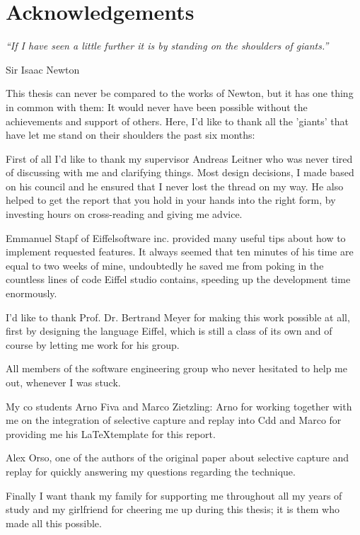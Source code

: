 \chapter*{Acknowledgements}
\begin{center}
 \textit{``If I have seen a little further it is by standing on the shoulders of giants.''}
\end{center}
\begin{flushright}
 Sir Isaac Newton
\end{flushright}

This thesis can never be compared to the works of Newton, but it has one thing in common with them: It would never have been possible without the achievements and support of others. Here, I'd like to thank all the 'giants' that have let me stand on their shoulders the past six months:

First of all I'd like to thank my supervisor Andreas Leitner who was never tired of discussing with me and clarifying things. Most design decisions, I made based on his council and he ensured that I never lost the thread on my way. He also helped to get the report that you hold in your hands into the right form, by investing hours on cross-reading and giving me advice.

Emmanuel Stapf of Eiffelsoftware inc. provided many useful tips about how to implement requested features. It always seemed that ten minutes of his time are equal to two weeks of mine, undoubtedly he saved me from poking in the countless lines of code Eiffel studio contains, speeding up the development time enormously.

I'd like to thank Prof. Dr. Bertrand Meyer for making this work possible at all, first by designing the language Eiffel, which is still a class of its own and of course by letting me work for his group.

All members of the software engineering group who never hesitated to help me out, whenever I was stuck.

My co students Arno Fiva and Marco Zietzling: Arno for working together with me on the integration of selective capture and replay into Cdd and Marco for providing me his \LaTeX template for this report.

Alex Orso, one of the authors of the original paper about selective capture and replay \cite{orso05may} for quickly answering my questions regarding the technique.

Finally I want thank my family for supporting me throughout all my years of study and my girlfriend for cheering me up during this thesis; it is them who made all this possible.